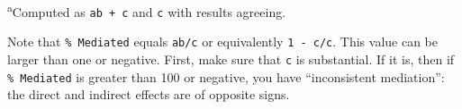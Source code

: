 \documentclass[
  man,floatsintext]{apa6}
\begin{document}
\textsuperscript{a}Computed as \texttt{ab\ +\ c\textquotesingle{}} and \texttt{c} with results agreeing.

Note that \texttt{\%\ Mediated} equals \texttt{ab/c} or equivalently \texttt{1\ -\ c\textquotesingle{}/c}. This value can be larger than one or negative. First, make sure that \texttt{c} is substantial. If it is, then if \texttt{\%\ Mediated} is greater than 100 or negative, you have ``inconsistent mediation'': the direct and indirect effects are of opposite signs.


\clearpage
\renewcommand{\listfigurename}{Figure captions}

\clearpage
\renewcommand{\listtablename}{Table captions}
\end{document}
